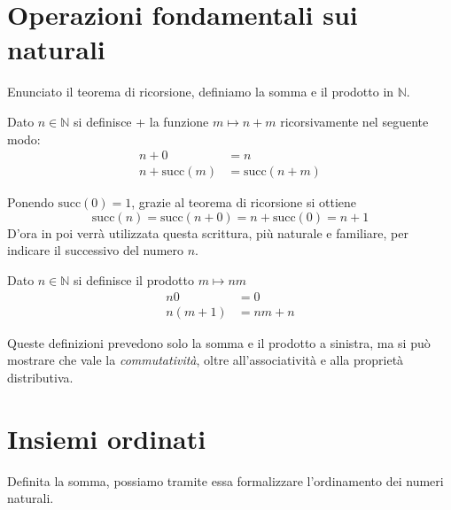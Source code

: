\documentclass[oneside]{book}
\begin{document}
\section{Operazioni fondamentali sui naturali}
Enunciato il teorema di ricorsione, definiamo la somma e il prodotto
in $\mathbb{N}$.
\begin{tcolorbox}[colback=yellow!30, colframe=yellow!30!black, title={Somma in $\mathbb{N}$}]
Dato $n\in\mathbb{N}$ si definisce + la funzione $m\mapsto n+m$ ricorsivamente
nel seguente modo:
\begin{align*}
    n + 0 &= n\\
    n + \text{succ}(m) &= \text{succ}(n + m)
\end{align*}
\end{tcolorbox}

Ponendo $\text{succ}(0) = 1$, grazie al teorema di ricorsione si ottiene
\[ \text{succ}(n) = \text{succ}(n + 0) = n + \text{succ}(0) = n + 1 \]
D'ora in poi verrà utilizzata questa scrittura, più naturale e familiare,
per indicare il successivo del numero $n$.

\begin{tcolorbox}[colback=yellow!30, colframe=yellow!30!black, title={Prodotto in $\mathbb{N}$}]
Dato $n\in\mathbb{N}$ si definisce il prodotto $m\mapsto nm$
\begin{align*}
    n0 &= 0\\
    n(m+1) &= nm + n
\end{align*}
\end{tcolorbox}

\begin{osservaz}
Queste definizioni prevedono solo la
somma e il prodotto a sinistra, ma si può mostrare che vale
la \textit{commutatività}, oltre all'associatività e alla
proprietà distributiva.
\end{osservaz}


\section{Insiemi ordinati}
Definita la somma, possiamo tramite essa formalizzare
l'ordinamento dei numeri naturali.
\end{document}

